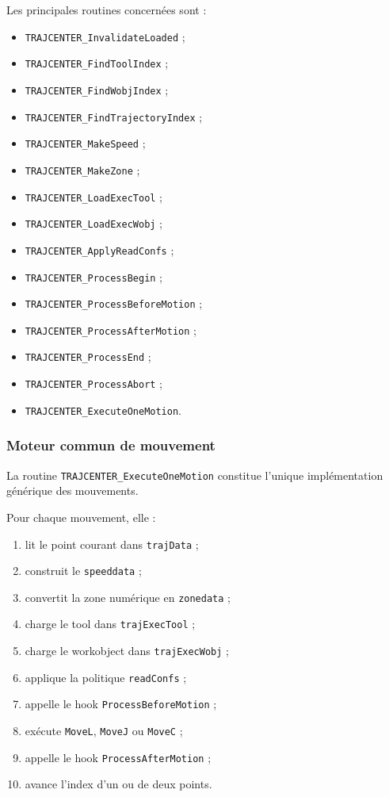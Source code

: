 \documentclass{rapportENSAM}
\begin{document}
Les principales routines concernées sont :

\begin{itemize}
    \item \texttt{TRAJCENTER\_InvalidateLoaded} ;
    \item \texttt{TRAJCENTER\_FindToolIndex} ;
    \item \texttt{TRAJCENTER\_FindWobjIndex} ;
    \item \texttt{TRAJCENTER\_FindTrajectoryIndex} ;
    \item \texttt{TRAJCENTER\_MakeSpeed} ;
    \item \texttt{TRAJCENTER\_MakeZone} ;
    \item \texttt{TRAJCENTER\_LoadExecTool} ;
    \item \texttt{TRAJCENTER\_LoadExecWobj} ;
    \item \texttt{TRAJCENTER\_ApplyReadConfs} ;
    \item \texttt{TRAJCENTER\_ProcessBegin} ;
    \item \texttt{TRAJCENTER\_ProcessBeforeMotion} ;
    \item \texttt{TRAJCENTER\_ProcessAfterMotion} ;
    \item \texttt{TRAJCENTER\_ProcessEnd} ;
    \item \texttt{TRAJCENTER\_ProcessAbort} ;
    \item \texttt{TRAJCENTER\_ExecuteOneMotion}.
\end{itemize}


\subsubsection{Moteur commun de mouvement}
\label{subsubsec:rapid-common-motion-engine}

La routine \texttt{TRAJCENTER\_ExecuteOneMotion} constitue l'unique
implémentation générique des mouvements.

Pour chaque mouvement, elle :

\begin{enumerate}
    \item lit le point courant dans \texttt{trajData} ;
    \item construit le \texttt{speeddata} ;
    \item convertit la zone numérique en \texttt{zonedata} ;
    \item charge le tool dans \texttt{trajExecTool} ;
    \item charge le workobject dans \texttt{trajExecWobj} ;
    \item applique la politique \texttt{readConfs} ;
    \item appelle le hook \texttt{ProcessBeforeMotion} ;
    \item exécute \texttt{MoveL}, \texttt{MoveJ} ou \texttt{MoveC} ;
    \item appelle le hook \texttt{ProcessAfterMotion} ;
    \item avance l'index d'un ou de deux points.
\end{enumerate}
\end{document}
